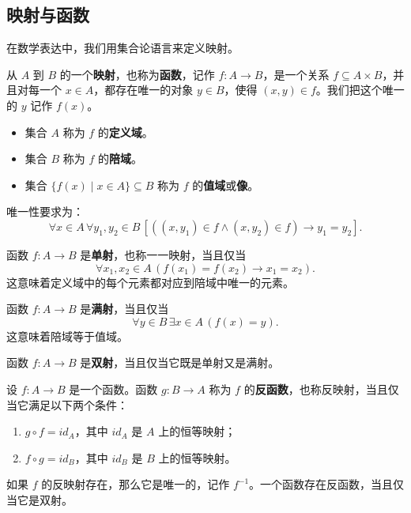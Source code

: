 \subsection{映射与函数}

在数学表达中，我们用集合论语言来定义映射。

\begin{definition}[映射/函数]
从 $A$ 到 $B$ 的一个\textbf{映射}，也称为\textbf{函数}，记作 $f:A\to B$，是一个关系 $f\subseteq A\times B$，并且对每一个 $x\in A$，都存在唯一的对象 $y\in B$，使得 $(x,y)\in f$。我们把这个唯一的 $y$ 记作 $f(x)$。
\begin{itemize}
    \item 集合 $A$ 称为 $f$ 的\textbf{定义域}。
    \item 集合 $B$ 称为 $f$ 的\textbf{陪域}。
    \item 集合 $\{f(x)\mid x\in A\}\subseteq B$ 称为 $f$ 的\textbf{值域}或\textbf{像}。
\end{itemize}
唯一性要求为：
\[
\forall x\in A\,\forall y_1,y_2\in B\,[((x,y_1)\in f\wedge(x,y_2)\in f)\to y_1=y_2].
\]
\end{definition}

\begin{definition}[单射]
函数 $f:A\to B$ 是\textbf{单射}，也称一一映射，当且仅当
\[
\forall x_1,x_2\in A\,(f(x_1)=f(x_2)\to x_1=x_2).
\]
这意味着定义域中的每个元素都对应到陪域中唯一的元素。
\end{definition}

\begin{definition}[满射]
函数 $f:A\to B$ 是\textbf{满射}，当且仅当
\[
\forall y\in B\,\exists x\in A\,(f(x)=y).
\]
这意味着陪域等于值域。
\end{definition}

\begin{definition}[双射]
函数 $f:A\to B$ 是\textbf{双射}，当且仅当它既是单射又是满射。
\end{definition}

\begin{definition}[反函数]
设 $f:A\to B$ 是一个函数。函数 $g:B\to A$ 称为 $f$ 的\textbf{反函数}，也称反映射，当且仅当它满足以下两个条件：
\begin{enumerate}
    \item $g\circ f=id_A$，其中 $id_A$ 是 $A$ 上的恒等映射；
    \item $f\circ g=id_B$，其中 $id_B$ 是 $B$ 上的恒等映射。
\end{enumerate}
如果 $f$ 的反映射存在，那么它是唯一的，记作 $f^{-1}$。一个函数存在反函数，当且仅当它是双射。
\end{definition}

